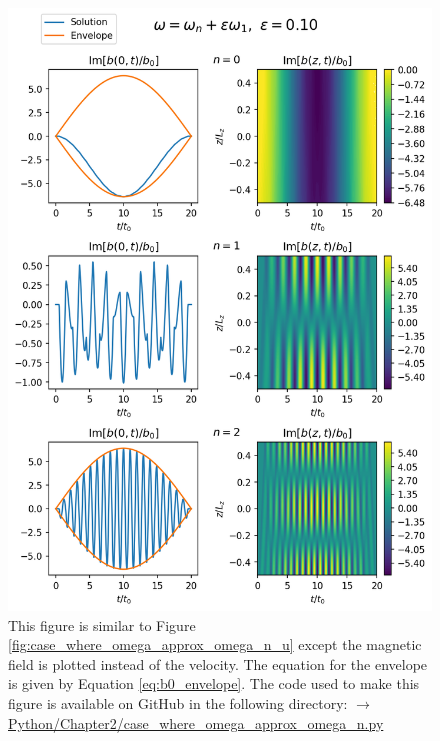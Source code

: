 \begin{figure}
    \centering
    \vspace{-30pt}
    \includegraphics[width=\textwidth,height=0.95\textheight,keepaspectratio]{figures/chapter02/case_where_omega_approx_omega_n_b.png}
    \vspace{-10pt}
    \caption{This figure is similar to Figure \ref{fig:case_where_omega_approx_omega_n_u} except the magnetic field is plotted instead of the velocity. The equation for the envelope is given by Equation \eqref{eq:b0_envelope}. The code used to make this figure is available on GitHub in the following directory:\newline
    \href{https://github.com/aleksyprok/apkp_thesis/blob/main/Python/Chapter2/case_where_omega_approx_omega_n.py}{$\rightarrow$ Python/Chapter2/case\_where\_omega\_approx\_omega\_n.py}}
    \vspace{-30pt}
    \label{fig:case_where_omega_approx_omega_n_b}
\end{figure}


